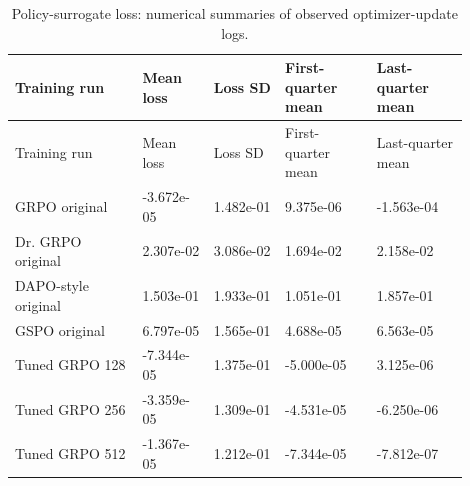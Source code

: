 \begingroup\footnotesize\setlength{\tabcolsep}{3pt}
\begin{longtable}{>{\raggedright\arraybackslash}p{0.2520\linewidth}>{\raggedright\arraybackslash}p{0.1440\linewidth}>{\raggedright\arraybackslash}p{0.1440\linewidth}>{\raggedright\arraybackslash}p{0.1800\linewidth}>{\raggedright\arraybackslash}p{0.1800\linewidth}}
\caption{Policy-surrogate loss: numerical summaries of observed optimizer-update logs.}\\
\toprule Training run & Mean loss & Loss SD & First-quarter mean & Last-quarter mean \\
\midrule\endfirsthead
\toprule Training run & Mean loss & Loss SD & First-quarter mean & Last-quarter mean \\
\midrule\endhead
\midrule\multicolumn{5}{r}{Continued on next page}\endfoot
\bottomrule\endlastfoot
GRPO original & -3.672e-05 & 1.482e-01 & 9.375e-06 & -1.563e-04 \\
Dr. GRPO original & 2.307e-02 & 3.086e-02 & 1.694e-02 & 2.158e-02 \\
DAPO-style original & 1.503e-01 & 1.933e-01 & 1.051e-01 & 1.857e-01 \\
GSPO original & 6.797e-05 & 1.565e-01 & 4.688e-05 & 6.563e-05 \\
Tuned GRPO 128 & -7.344e-05 & 1.375e-01 & -5.000e-05 & 3.125e-06 \\
Tuned GRPO 256 & -3.359e-05 & 1.309e-01 & -4.531e-05 & -6.250e-06 \\
Tuned GRPO 512 & -1.367e-05 & 1.212e-01 & -7.344e-05 & -7.812e-07 \\
\end{longtable}\endgroup


